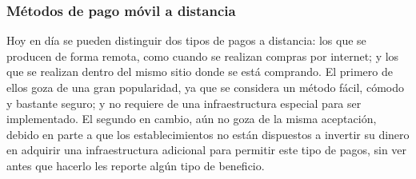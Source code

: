     \subsubsection{Métodos de pago móvil a distancia}
  Hoy en día se pueden distinguir dos tipos de pagos a distancia: los que se
  producen de forma remota, como cuando se realizan compras por internet;
  y los que se realizan dentro del mismo sitio donde se está
  comprando. El primero de ellos goza de una gran popularidad, ya que se
  considera un método fácil, cómodo y bastante seguro; y no requiere de una
  infraestructura especial para ser implementado. El segundo en cambio,
  aún no goza de la misma aceptación, debido en parte a que los 
  establecimientos no están dispuestos a invertir su dinero en adquirir una 
  infraestructura adicional para permitir este tipo de pagos, sin ver antes 
  que hacerlo les reporte algún tipo de beneficio.

